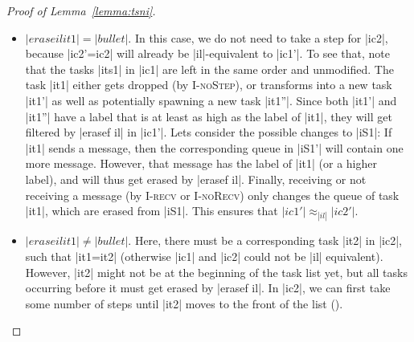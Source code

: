 {\begin{proof}[Proof of Lemma~\ref{lemma:tsni}]
\begin{itemize}
    \item $|erase il it1|=|bullet|$. In this case, we do not need to take a
    step for
    |ic2|, because |ic2'=ic2| will already be |il|-equivalent to |ic1'|.
    To see that, note that the tasks |its1| in |ic1| are left in the
    same order and unmodified. The task |it1| either
    gets dropped (by \textsc{I-noStep}), or
    transforms into a new task |it1'| as well as potentially spawning a new
    task |it1''|.  Since both |it1'| and |it1''| have a label that is
    at least as high as the label of |it1|, they will get filtered
    by |erasef il| in |ic1'|.
    Lets consider the possible changes to |iS1|: If |it1| sends a
    message, then the corresponding queue in |iS1'| will contain one
    more message.  However, that message has the label of |it1| (or a higher
    label), and will thus get erased by |erasef il|.
    Finally, receiving or not receiving a message (by
    \textsc{I-recv} or \textsc{I-noRecv}) only changes the queue of
    task |it1|, which are erased from |iS1|.
    This ensures that $|ic1'|\approx_{|il|}|ic2'|$.
    
    \item $|erase il it1|\neq|bullet|$.  Here, there must be a corresponding
    task |it2| in |ic2|,
    such that |it1=it2| (otherwise |ic1| and
    |ic2| could not be |il| equivalent).
    However, |it2| might not be at the beginning of the task list yet, but
    all tasks occurring before it must get erased by |erasef il|.
    In |ic2|, we can first take some number of steps until |it2| moves
    to the front of the list ().
    
    

\end{itemize}
\end{proof}}
